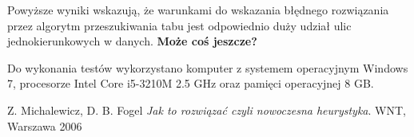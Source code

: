 \documentclass[11pt,a4paper,twoside]{article}
\begin{document}
Powyższe wyniki wskazują, że warunkami do wskazania błędnego rozwiązania przez algorytm przeszukiwania tabu jest odpowiednio duży udział ulic jednokierunkowych w danych. \textbf{Może coś jeszcze?}

Do wykonania testów wykorzystano komputer z systemem operacyjnym Windows 7, procesorze Intel Core i5-3210M 2.5 GHz oraz pamięci operacyjnej 8 GB. 

  
\begin{thebibliography}{9}
Z. Michalewicz, D. B. Fogel
\emph{Jak to rozwiązać czyli nowoczesna heurystyka}.
WNT, Warszawa 2006
\end{thebibliography}
\end{document}
